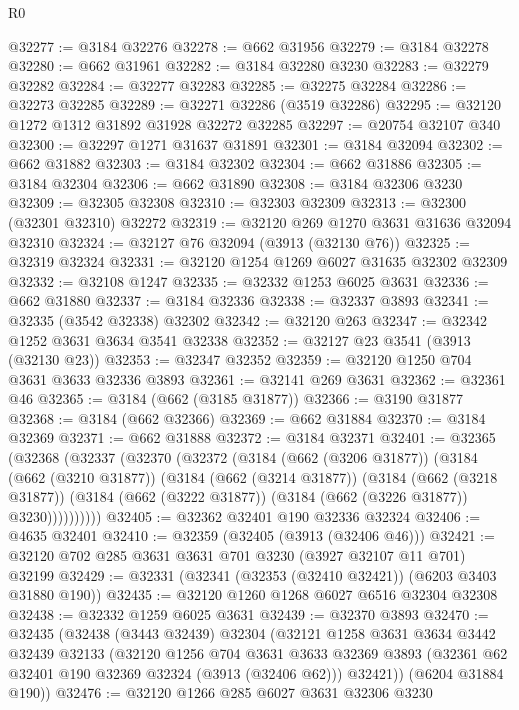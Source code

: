 \begin{lexlean}{R0}
\begin{coremodule}
@32277 := @3184 @32276
@32278 := @662 @31956
@32279 := @3184 @32278
@32280 := @662 @31961
@32282 := @3184 @32280 @3230
@32283 := @32279 @32282
@32284 := @32277 @32283
@32285 := @32275 @32284
@32286 := @32273 @32285
@32289 := @32271 @32286 (@3519 @32286)
@32295 := @32120 @1272 @1312 @31892 @31928 @32272 @32285
@32297 := @20754 @32107 @340
@32300 := @32297 @1271 @31637 @31891
@32301 := @3184 @32094
@32302 := @662 @31882
@32303 := @3184 @32302
@32304 := @662 @31886
@32305 := @3184 @32304
@32306 := @662 @31890
@32308 := @3184 @32306 @3230
@32309 := @32305 @32308
@32310 := @32303 @32309
@32313 := @32300 (@32301 @32310) @32272
@32319 := @32120 @269 @1270 @3631 @31636 @32094 @32310
@32324 := @32127 @76 @32094 (@3913 (@32130 @76))
@32325 := @32319 @32324
@32331 := @32120 @1254 @1269 @6027 @31635 @32302 @32309
@32332 := @32108 @1247
@32335 := @32332 @1253 @6025 @3631
@32336 := @662 @31880
@32337 := @3184 @32336
@32338 := @32337 @3893
@32341 := @32335 (@3542 @32338) @32302
@32342 := @32120 @263
@32347 := @32342 @1252 @3631 @3634 @3541 @32338
@32352 := @32127 @23 @3541 (@3913 (@32130 @23))
@32353 := @32347 @32352
@32359 := @32120 @1250 @704 @3631 @3633 @32336 @3893
@32361 := @32141 @269 @3631
@32362 := @32361 @46
@32365 := @3184 (@662 (@3185 @31877))
@32366 := @3190 @31877
@32368 := @3184 (@662 @32366)
@32369 := @662 @31884
@32370 := @3184 @32369
@32371 := @662 @31888
@32372 := @3184 @32371
@32401 := @32365
    (@32368
      (@32337
        (@32370
          (@32372
            (@3184
              (@662 (@3206 @31877))
              (@3184
                (@662 (@3210 @31877))
                (@3184
                  (@662 (@3214 @31877))
                  (@3184
                    (@662 (@3218 @31877))
                    (@3184 (@662 (@3222 @31877)) (@3184 (@662 (@3226 @31877)) @3230))))))))))
@32405 := @32362 @32401 @190 @32336 @32324
@32406 := @4635 @32401
@32410 := @32359 (@32405 (@3913 (@32406 @46)))
@32421 := @32120 @702 @285 @3631 @3631 @701 @3230 (@3927 @32107 @11 @701) @32199
@32429 := @32331 (@32341 (@32353 (@32410 @32421)) (@6203 @3403 @31880 @190))
@32435 := @32120 @1260 @1268 @6027 @6516 @32304 @32308
@32438 := @32332 @1259 @6025 @3631
@32439 := @32370 @3893
@32470 := @32435
    (@32438
      (@3443 @32439)
      @32304
      (@32121
        @1258
        @3631
        @3634
        @3442
        @32439
        @32133
        (@32120
          @1256
          @704
          @3631
          @3633
          @32369
          @3893
          (@32361 @62 @32401 @190 @32369 @32324 (@3913 (@32406 @62)))
          @32421))
      (@6204 @31884 @190))
@32476 := @32120 @1266 @285 @6027 @3631 @32306 @3230

\end{coremodule}
\end{lexlean}
